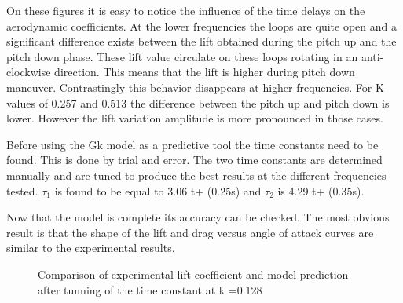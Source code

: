\FloatBarrier

\par On these figures it is easy to notice the influence of the time delays on the aerodynamic coefficients.
At the lower frequencies the loops are quite open and a significant difference exists between the lift obtained during the pitch up and the pitch down phase.
These lift value circulate on these loops rotating in an anti-clockwise direction.
This means that the lift is higher during pitch down maneuver.
Contrastingly this behavior disappears at higher frequencies.
For K values of 0.257 and 0.513 the difference between the pitch up and pitch down is lower.
However the lift variation amplitude is more pronounced in those cases.

\par Before using the Gk model as a predictive tool the time constants need to be found.
This is done by trial and error.
The two time constants are determined manually and are tuned to produce the best results at the different frequencies tested.
$\tau_1$ is found to be equal to 3.06 t+ (0.25s) and $\tau_2$ is 4.29 t+ (0.35s).

\par Now that the model is complete its accuracy can be checked.
The most obvious result is that the shape of the lift and drag versus angle of attack curves are similar to the experimental results.

\begin{figure}[h]
  \begin{center}
  \end{center}
  \caption{Comparison of experimental lift coefficient and model prediction after tunning of the time constant at k =0.128}
  \label{fig:Cl_u=3_meanaoa=12_amp=2_freq=0p5}
\end{figure}

